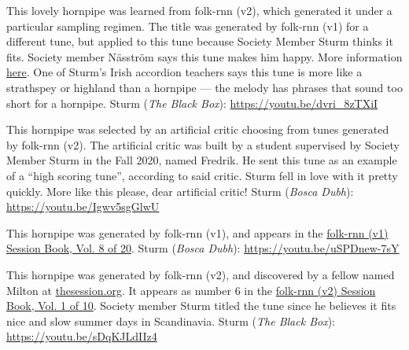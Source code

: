 \documentclass[a4paper,notitlepage,twoside]{book}
\begin{document}
{}  
\hypertarget{hornpipe:LiddleShepe}{}
This lovely hornpipe was learned from folk-rnn (v2),
which generated it under a particular sampling regimen.
The title was generated by folk-rnn (v1) for a different tune, 
but applied to this tune because Society Member Sturm thinks it fits.
Society member Näsström says this tune makes him happy.
More information \href{https://highnoongmt.wordpress.com/2019/08/19/making-sense-of-the-folk-rnn-v2-model-part-11/}{here}.
One of Sturm's Irish accordion teachers says this tune is more like a strathspey or highland 
than a hornpipe --- the melody has phrases that sound too short for a hornpipe.
Sturm ({\em The Black Box}): \url{https://youtu.be/dvri_8zTXiI}
  
{}\label{hornpipe:FredriksChristmasCritic}
\hypertarget{hornpipe:FredriksChristmasCritic}{}
This hornpipe was selected by an artificial critic choosing from tunes generated by folk-rnn (v2). The artificial critic was built by a student supervised by Society Member Sturm in the Fall 2020, named Fredrik. He sent  this tune as an example of a ``high scoring tune'', according to said critic. Sturm fell in love with it pretty quickly. More like this please, dear artificial critic! Sturm ({\em Bosca Dubh}): \url{https://youtu.be/Igwv5sgGlwU}

{}  
  
\hypertarget{hornpipe:SorpikesCat}{}
This hornpipe was generated by folk-rnn (v1), and
appears in the \href{https://highnoongmt.wordpress.com/2018/01/05/volumes-1-20-of-folk-rnn-v1-transcriptions}{folk-rnn (v1) Session Book, Vol. 8 of 20}.
Sturm ({\em Bosca Dubh}): \url{https://youtu.be/uSPDnew-7sY}

{}  
  
\hypertarget{hornpipe:SocksandSandals}{}
This hornpipe was generated by folk-rnn (v2), and
discovered by a fellow named Milton at \href{https://thesession.org/discussions/40416}{thesession.org}.
It appears as number 6 in the \href{https://highnoongmt.wordpress.com/2018/01/05/volumes-1-20-of-folk-rnn-v1-transcriptions}{folk-rnn (v2) Session Book, Vol. 1 of 10}.
Society member Sturm titled the tune since he believes it fits
nice and slow summer days in Scandinavia.
Sturm ({\em The Black Box}): \url{https://youtu.be/sDqKJLdIIz4}
\end{document}
